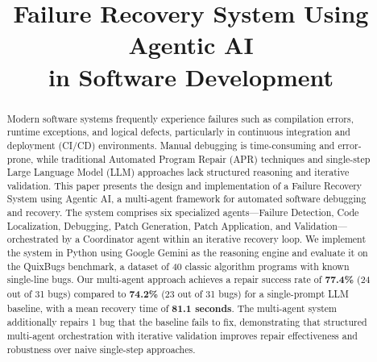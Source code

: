 \documentclass[conference]{IEEEtran}
\begin{document}
\title{Failure Recovery System Using Agentic AI\\in Software Development}

\author{
\and
{}
\and
{}
}

\maketitle

\begin{abstract}
Modern software systems frequently experience failures such as compilation errors, runtime exceptions, and logical defects, particularly in continuous integration and deployment (CI/CD) environments. Manual debugging is time-consuming and error-prone, while traditional Automated Program Repair (APR) techniques and single-step Large Language Model (LLM) approaches lack structured reasoning and iterative validation. This paper presents the design and implementation of a Failure Recovery System using Agentic AI, a multi-agent framework for automated software debugging and recovery. The system comprises six specialized agents---Failure Detection, Code Localization, Debugging, Patch Generation, Patch Application, and Validation---orchestrated by a Coordinator agent within an iterative recovery loop. We implement the system in Python using Google Gemini as the reasoning engine and evaluate it on the QuixBugs benchmark, a dataset of 40 classic algorithm programs with known single-line bugs. Our multi-agent approach achieves a repair success rate of \textbf{77.4\%} (24 out of 31 bugs) compared to \textbf{74.2\%} (23 out of 31 bugs) for a single-prompt LLM baseline, with a mean recovery time of \textbf{81.1 seconds}. The multi-agent system additionally repairs 1 bug that the baseline fails to fix, demonstrating that structured multi-agent orchestration with iterative validation improves repair effectiveness and robustness over naive single-step approaches.
\end{abstract}
\end{document}

